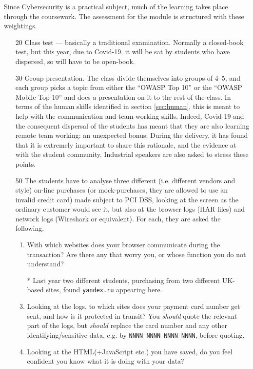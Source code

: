 \documentclass[conference]{IEEEtran}
\begin{document}
Since Cybersecurity is a practical subject, much of the learning takes place through the coursework. The assessment for the module is structured with these weightings.
\begin{itemize}
\item[20]Class test --- basically a traditional examination. Normally a closed-book test, but this year, due to Covid-19, it will be sat by students who have dispersed, so will have to be open-book.
\item[30]Group presentation. The class divide themselves into groups of 4--5, and each group picks a topic from either the ``OWASP Top 10'' \cite{OWASP2017a} or the ``OWASP Mobile Top  10'' \cite{OWASP2016a} and does a presentation on it to the rest of the class.  In terms of the human skills identified in section \ref{sec:human}, this is meant to help with the communication and team-working skills. Indeed, Covid-19 and the consequent dispersal of the students has meant that they are also learning remote team working: an unexpected bonus.  During the delivery, it has found that it is extremely important to share this rationale, and the evidence at \cite{WallStreetJournal2018c,InfoSec2019a,Beaver2019c} with the student community.  Industrial speakers are also asked to stress these points.
\item[50]The students have to analyse three different (i.e. different vendors and style) on-line purchases (or mock-purchases, they are allowed to use an invalid  credit card) made subject to PCI DSS, looking at the screen as the ordinary customer would see it, but also at the browser logs (HAR files) and network logs (Wireshark or equivalent). For each, they are asked the following.
\begin{enumerate}
\item With which websites does your browser communicate during the transaction? Are there any that worry you, or whose function you do not understand?
\item[*]Last year two different students, purchasing from two different UK-based sites, found \verb+yandex.ru+ appearing here.
\item Looking at the logs, to which sites does your payment card number get sent, and how is it protected in transit? You \emph{should} quote the relevant part of the logs, but \emph{should} replace the card number and any other identifying/sensitive data, e.g. by \verb+NNNN NNNN NNNN NNNN+, before quoting.
\item Looking at the HTML(+JavaScript etc.) you have saved, do you feel confident you know what it is doing with your data?

\end{enumerate}
\end{itemize}
\end{document}
